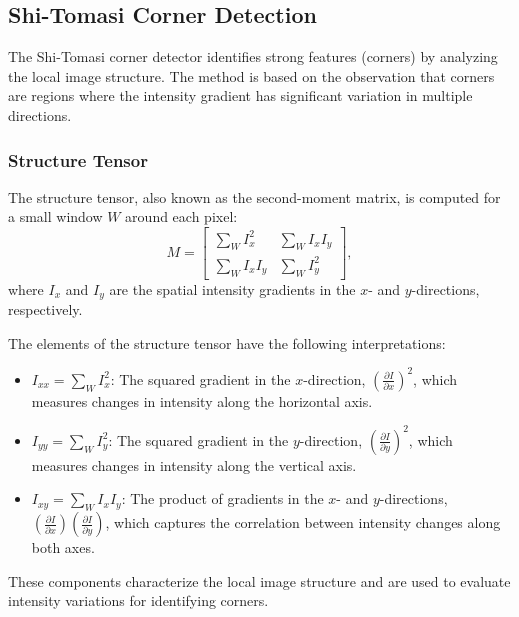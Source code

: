 \documentclass[11pt, conference, letterpaper]{IEEEtran}
\begin{document}

\subsection{Shi-Tomasi Corner Detection}
The Shi-Tomasi corner detector identifies strong features (corners) by analyzing the local image structure. The method is based on the observation that corners are regions where the intensity gradient has significant variation in multiple directions.

\subsubsection{Structure Tensor}
The structure tensor, also known as the second-moment matrix, is computed for a small window \(W\) around each pixel:
\begin{equation}
M = \begin{bmatrix}
\sum_W I_x^2 & \sum_W I_x I_y \\
\sum_W I_x I_y & \sum_W I_y^2
\end{bmatrix},
\end{equation}
where \(I_x\) and \(I_y\) are the spatial intensity gradients in the \(x\)- and \(y\)-directions, respectively.

The elements of the structure tensor have the following interpretations:
\begin{itemize}
    \item \(I_{xx} = \sum_W I_x^2\): The squared gradient in the \(x\)-direction, \((\frac{\partial I}{\partial x})^2\), which measures changes in intensity along the horizontal axis.
    \item \(I_{yy} = \sum_W I_y^2\): The squared gradient in the \(y\)-direction, \((\frac{\partial I}{\partial y})^2\), which measures changes in intensity along the vertical axis.
    \item \(I_{xy} = \sum_W I_x I_y\): The product of gradients in the \(x\)- and \(y\)-directions, \((\frac{\partial I}{\partial x})(\frac{\partial I}{\partial y})\), which captures the correlation between intensity changes along both axes.
\end{itemize}

These components characterize the local image structure and are used to evaluate intensity variations for identifying corners. 
\bigskip
\end{document}
